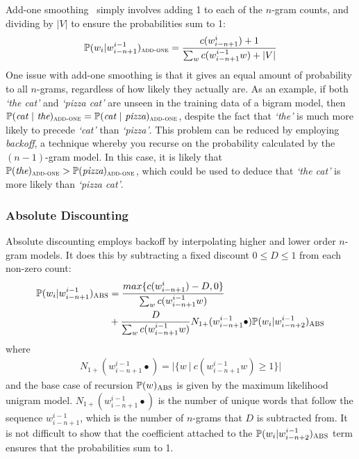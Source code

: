 \documentclass[a4paper, 12pt]{report}
\newcommand{\tit}[1]{\textit{#1}}
\begin{document}
Add-one smoothing~\cite{add1_smoothing:johnson1932} simply involves adding 1 to each of the $n$-gram counts, and dividing by $|V|$ to ensure the probabilities sum to 1:
\begin{gather*}
	\mathbb{P}(w_i | w_{i - n + 1}^{i - 1})_{\text{\scshape add-one}} = \frac{c(w_{i - n + 1}^{i}) + 1}{\sum_w c(w_{i - n + 1}^{i - 1}w) + |V|}
\end{gather*}
One issue with add-one smoothing is that it gives an equal amount of probability to all $n$-grams, regardless of how likely they actually are. As an example, if both \tit{`the cat'} and \tit{`pizza cat'} are unseen in the training data of a bigram model, then $\mathbb{P}(\tit{cat}\ |\ \tit{the})_{\text{\scshape add-one}} = \mathbb{P}(\tit{cat}\ |\ \tit{pizza})_{\text{\scshape add-one}}$, despite the fact that \tit{`the'} is much more likely to precede \tit{`cat'} than \tit{`pizza'}. This problem can be reduced by employing \tit{backoff}, a technique whereby you recurse on the probability calculated by the $(n - 1)$-gram model. In this case, it is likely that $\mathbb{P}(\tit{the})_{\text{\scshape add-one}} > \mathbb{P}(\tit{pizza})_{\text{\scshape add-one}}$, which could be used to deduce that \tit{`the cat'} is more likely than \tit{`pizza cat'}.

\subsubsection{Absolute Discounting}

Absolute discounting employs backoff by interpolating higher and lower order $n$-gram models. It does this by subtracting a fixed discount $0 \leq D \leq 1$ from each non-zero count:
\begin{equation*}
\begin{aligned}
	\mathbb{P}(w_i | w_{i - n + 1}^{i - 1})_{\text{\scshape ABS}} &= \frac{max\{c(w_{i - n + 1}^{i}) - D, 0\}}{\sum_w c(w_{i - n + 1}^{i - 1}w)} \\
	&+ \frac{D}{\sum_w c(w_{i - n + 1}^{i - 1}w)}N_{1+}(w_{i - n + 1}^{i - 1}\bullet)\mathbb{P}(w_i | w_{i - n + 2}^{i - 1})_{\text{\scshape ABS}}
\end{aligned}
\end{equation*}
where
\begin{gather*}
	N_{1+}(w_{i - n + 1}^{i - 1}\bullet) = |\{ w\ |\ c(w_{i - n + 1}^{i - 1}w) \geq 1 \}|
\end{gather*}
and the base case of recursion $\mathbb{P}(w)_{\text{\scshape ABS}}$ is given by the maximum likelihood unigram model. $N_{1+}(w_{i - n + 1}^{i - 1}\bullet)$ is the number of unique words that follow the sequence $w_{i - n + 1}^{i - 1}$, which is the number of $n$-grams that $D$ is subtracted from. It is not difficult to show that the coefficient attached to the $\mathbb{P}(w_i | w_{i - n + 2}^{i - 1})_{\text{\scshape ABS}}$ term ensures that the probabilities sum to 1. \\
\end{document}
